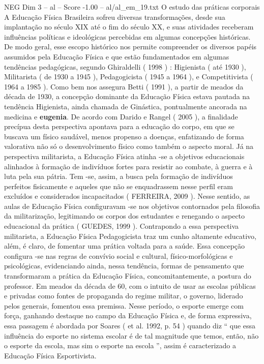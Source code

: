 \begin{textsample}{NEG Dim 3 – al – Score -1.00 – al/al\_em\_19.txt}  \label{ex:f3_neg_071}
O estudo das práticas corporais A Educação Física Brasileira sofreu diversas transformações, desde sua implantação no século XIX até o fim do século XX, e suas atividades receberam influências políticas e ideológicas percebidas em algumas concepções históricas.
De modo geral, esse escopo histórico nos permite compreender os diversos papéis assumidos pela Educação Física e que estão fundamentados em algumas tendências pedagógicas, segundo Ghiraldelli ( 1998 ) : Higienista ( até 1930 ), Militarista ( de 1930 a 1945 ), Pedagogicista ( 1945 a 1964 ), e Competitivista ( 1964 a 1985 ).
Como bem nos assegura Betti ( 1991 ), a partir de meados da década de 1930, a concepção dominante da Educação Física estava pautada na tendência Higienista, ainda chamada de Ginástica, pontualmente ancorada na medicina e \textbf{eugenia}.
De acordo com Darido e Rangel ( 2005 ), a finalidade precípua desta perspectiva apontava para a educação do corpo, em que se buscava um físico saudável, menos propenso a doenças, enfatizando de forma valorativa não só o desenvolvimento físico como também o aspecto moral.
Já na perspectiva militarista, a Educação Física atinha -se a objetivos educacionais alinhados à formação de indivíduos fortes para resistir ao combate, à guerra e à luta pela sua pátria.
Tem -se, assim, a busca pela formação de indivíduos perfeitos fisicamente e aqueles que não se enquadrassem nesse perfil eram excluídos e considerados incapacitados ( FERREIRA, 2009 ).
Nesse sentido, as aulas de Educação Física configuravam -se nos objetivos contornados pela filosofia da militarização, legitimando os corpos dos estudantes e renegando o aspecto educacional da prática ( GUEDES, 1999 ).
Contrapondo a essa perspectiva militarista, a Educação Física Pedagogicista traz um cunho altamente educativo, além, é claro, de fomentar uma prática voltada para a saúde.
Essa concepção configura -se nas regras de convívio social e cultural, físico-morfológicas e psicológicas, evidenciando ainda, nessa tendência, formas de pensamento que transformaram a prática da Educação Física, concomitantemente, a postura do professor.
Em meados da década de 60, com o intuito de usar as escolas públicas e privadas como fontes de propaganda do regime militar, o governo, liderado pelos generais, fomentou essa premissa.
Nesse período, o esporte emerge com força, ganhando destaque no campo da Educação Física e, de forma expressiva, essa passagem é abordada por Soares ( et al. 1992, p. 54 ) quando diz “ que essa influência do esporte no sistema escolar é de tal magnitude que temos, então, não o esporte da escola, mas sim o esporte na escola ”, assim é caracterizado a Educação Física Esportivista.

\end{textsample}
